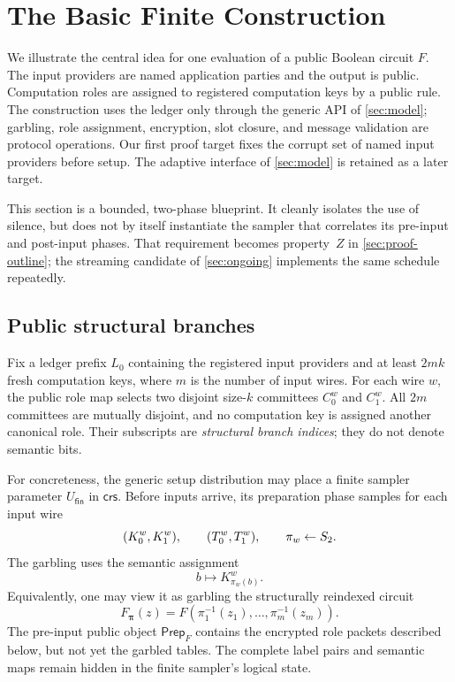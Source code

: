 \section{The Basic Finite Construction}
\label{sec:basic-construction}

We illustrate the central idea for one evaluation of a public Boolean circuit
$F$.  The input providers are named application parties and the output is
public.  Computation roles are assigned to registered computation keys by a
public rule.  The construction uses the ledger only through the generic API
of \cref{sec:model}; garbling, role assignment, encryption, slot closure, and
message validation are protocol operations.  Our first proof target fixes the
corrupt set of named input providers before setup.  The adaptive interface of
\cref{sec:model} is retained as a later target.

This section is a bounded, two-phase blueprint.  It cleanly isolates the use
of silence, but does not by itself instantiate the sampler that correlates its
pre-input and post-input phases.  That requirement becomes property~$Z$ in
\cref{sec:proof-outline}; the streaming candidate of \cref{sec:ongoing}
implements the same schedule repeatedly.

\subsection{Public structural branches}

Fix a ledger prefix $L_0$ containing the registered input providers and at
least $2mk$ fresh computation keys, where $m$ is the number of input wires.
For each wire $w$, the public role map selects two disjoint size-$k$
committees $C^w_0$ and $C^w_1$.  All $2m$ committees are mutually disjoint,
and no computation key is assigned another canonical role.  Their subscripts
are \emph{structural branch indices}; they do not denote semantic bits.

For concreteness, the generic setup distribution may place a finite sampler
parameter $U_{\mathsf{fin}}$ in $\mathsf{crs}$.  Before inputs arrive, its
preparation phase samples for each input wire
\[
  (K^w_0,K^w_1),\qquad (T^w_0,T^w_1),\qquad
  \pi_w\mathrel{\leftarrow} S_2 .
\]
The garbling uses the semantic assignment
\[
  b\longmapsto K^w_{\pi_w(b)}.
  \label{eq:semantic-assignment}
\]
Equivalently, one may view it as garbling the structurally reindexed circuit
\[
  F_{\boldsymbol\pi}(z)=
  F(\pi_1^{-1}(z_1),\ldots,\pi_m^{-1}(z_m)).
\]
The pre-input public object $\mathsf{Prep}_F$ contains
the encrypted role packets described below, but not yet the garbled tables.
The complete label pairs and semantic maps remain hidden in the finite
sampler's logical state.

